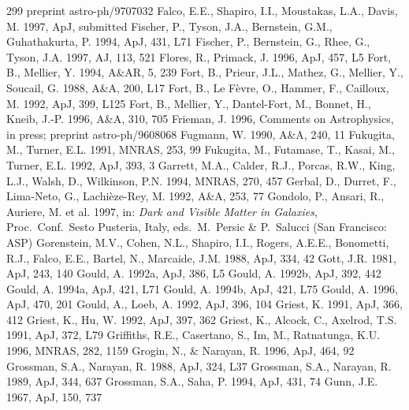 \documentclass[a4paper,10pt]{article} %
\begin{document}
\begin{thebibliography}{299}
  preprint astro-ph/9707032
  Falco, E.E., Shapiro, I.I., Moustakas, L.A., Davis, M. 1997, ApJ,
  submitted
  Fischer, P., Tyson, J.A., Bernstein, G.M., Guhathakurta, P. 1994,
  ApJ, 431, L71
  Fischer, P., Bernstein, G., Rhee, G., Tyson, J.A. 1997, AJ, 113, 521
  Flores, R., Primack, J. 1996, ApJ, 457, L5
  Fort, B., Mellier, Y. 1994, A\&AR, 5, 239
  Fort, B., Prieur, J.L., Mathez, G., Mellier, Y., Soucail, G. 1988,
  A\&A, 200, L17
  Fort, B., Le F\`evre, O., Hammer, F., Cailloux, M. 1992, ApJ, 399,
  L125
  Fort, B., Mellier, Y., Dantel-Fort, M., Bonnet, H., Kneib,
  J.-P. 1996, A\&A, 310, 705
  Frieman, J. 1996, Comments on Astrophysics, in press; preprint
  astro-ph/9608068
  Fugmann, W. 1990, A\&A, 240, 11
  Fukugita, M., Turner, E.L. 1991, MNRAS, 253, 99
  Fukugita, M., Futamase, T., Kasai, M., Turner, E.L. 1992, ApJ, 393,
  3
  Garrett, M.A., Calder, R.J., Porcas, R.W., King, L.J., Walsh, D.,
  Wilkinson, P.N. 1994, MNRAS, 270, 457
  Gerbal, D., Durret, F., Lima-Neto, G., Lachi\`eze-Rey, M. 1992,
  A\&A, 253, 77
  Gondolo, P., Ansari, R., Auriere, M. et al. 1997, in: {\em Dark and
  Visible Matter in Galaxies\/}, Proc.\ Conf.\ Sesto Pusteria, Italy,
  eds.\ M.\ Persic \& P.\ Salucci (San Francisco: ASP)
  Gorenstein, M.V., Cohen, N.L., Shapiro, I.I., Rogers, A.E.E.,
  Bonometti, R.J., Falco, E.E., Bartel, N., Marcaide, J.M. 1988, ApJ,
  334, 42
  Gott, J.R. 1981, ApJ, 243, 140
  Gould, A. 1992a, ApJ, 386, L5
  Gould, A. 1992b, ApJ, 392, 442
  Gould, A. 1994a, ApJ, 421, L71
  Gould, A. 1994b, ApJ, 421, L75
  Gould, A. 1996, ApJ, 470, 201
  Gould, A., Loeb, A. 1992, ApJ, 396, 104
  Griest, K. 1991, ApJ, 366, 412
  Griest, K., Hu, W. 1992, ApJ, 397, 362
  Griest, K., Alcock, C., Axelrod, T.S. 1991, ApJ, 372, L79
  Griffiths, R.E., Casertano, S., Im, M., Ratnatunga, K.U. 1996,
  MNRAS, 282, 1159
  Grogin, N., \& Narayan, R. 1996, ApJ, 464, 92
  Grossman, S.A., Narayan, R. 1988, ApJ, 324, L37
  Grossman, S.A., Narayan, R. 1989, ApJ, 344, 637
  Grossman, S.A., Saha, P. 1994, ApJ, 431, 74
  Gunn, J.E. 1967, ApJ, 150, 737

\end{thebibliography}
\end{document}
